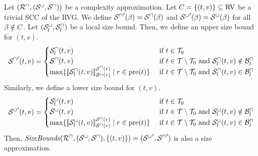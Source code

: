 \begin{theorem}
  Let $({\mathcal{R}^\sqcap}, {({\mathcal{S}^\sqcup}, {\mathcal{S}^\sqcap})})$ be a complexity approximation.
  Let $C = \lbrace (t,v) \rbrace \subseteq \text{RV}$ be a trivial SCC of the RVG.
  We define ${\mathcal{S}^\sqcap}'(\beta) = {\mathcal{S}^\sqcap}(\beta)$ and ${\mathcal{S}^\sqcup}'(\beta) = {\mathcal{S}^\sqcup}(\beta)$ for all $\beta \notin C$.
  Let ${({\mathcal{S}^\sqcup_l}, {\mathcal{S}^\sqcap_l})}$ be a local size bound.
  Then, we define an upper size bound for $(t,v)$. 
  \[ {\mathcal{S}^\sqcap}'(t,v) =
  \begin{cases}
    {\mathcal{S}^\sqcap_l}(t, v) & \text{ if } t \in \mathcal{T}_0 \\
    {\mathcal{S}^\sqcap}(t, v) & \text{ if } t \in \mathcal{T} \setminus \mathcal{T}_0 \text{ and } {\mathcal{S}^\sqcap_l}(t,v) \notin \mathcal{B}^\sqcap_l \\
    \max \lbrace  \llbracket {\mathcal{S}^\sqcap_l}(t,v) \rrbracket_{{\mathcal{S}^\sqcup}(r)}^{{\mathcal{S}^\sqcap}(r)} \mid r \in \text{pre}(t) \rbrace & \text{ if } t \in \mathcal{T} \setminus \mathcal{T}_0 \text{ and } {\mathcal{S}^\sqcap_l}(t,v) \in \mathcal{B}^\sqcap_l \\
  \end{cases}
  \]
  Similarly, we define a lower size bound for $(t,v)$.
  \[ {\mathcal{S}^\sqcup}'(t,v) =
  \begin{cases}
    {\mathcal{S}^\sqcup_l}(t, v) & \text{ if } t \in \mathcal{T}_0 \\
    {\mathcal{S}^\sqcup}(t, v) & \text{ if } t \in \mathcal{T} \setminus \mathcal{T}_0 \text{ and } {\mathcal{S}^\sqcup_l}(t,v) \notin \mathcal{B}^\sqcap_l \\
    \max \lbrace  \llbracket {\mathcal{S}^\sqcup_l}(t,v) \rrbracket_{{\mathcal{S}^\sqcap}(r)}^{{\mathcal{S}^\sqcup}(r)} \mid r \in \text{pre}(t) \rbrace & \text{ if } t \in \mathcal{T} \setminus \mathcal{T}_0 \text{ and } {\mathcal{S}^\sqcup_l}(t,v) \in \mathcal{B}^\sqcap_l \\
  \end{cases}
  \]
  Then, $\mathit{SizeBounds}({\mathcal{R}^\sqcap}, {({\mathcal{S}^\sqcup}, {\mathcal{S}^\sqcap})}, \lbrace (t,v) \rbrace) = ({\mathcal{S}^\sqcup}', {\mathcal{S}^\sqcap}')$ is also a size approximation.
\end{theorem}
